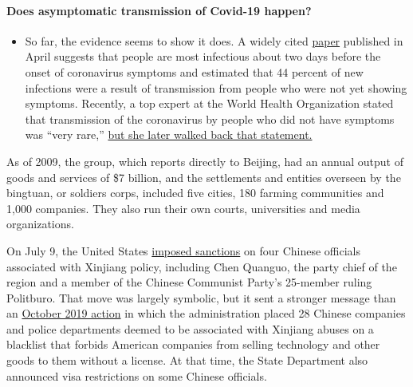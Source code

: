 \begin{itemize}
{  \paragraph{Does asymptomatic transmission of Covid-19
  happen?}\label{does-asymptomatic-transmission-of-covid-19-happen}}

  \begin{itemize}
  \tightlist
  \item
    So far, the evidence seems to show it does. A widely cited
    \href{https://www.nature.com/articles/s41591-020-0869-5}{paper}
    published in April suggests that people are most infectious about
    two days before the onset of coronavirus symptoms and estimated that
    44 percent of new infections were a result of transmission from
    people who were not yet showing symptoms. Recently, a top expert at
    the World Health Organization stated that transmission of the
    coronavirus by people who did not have symptoms was ``very rare,''
    \href{https://www.nytimes3xbfgragh.onion/2020/06/09/world/coronavirus-updates.html?action=click\&pgtype=Article\&state=default\&region=MAIN_CONTENT_3\&context=storylines_faq\#link-1f302e21}{but
    she later walked back that statement.}
  \end{itemize}
\end{itemize}

As of 2009, the group, which reports directly to Beijing, had an annual
output of goods and services of \$7 billion, and the settlements and
entities overseen by the bingtuan, or soldiers corps, included five
cities, 180 farming communities and 1,000 companies. They also run their
own courts, universities and media organizations.

On July 9, the United States
\href{https://www.nytimes3xbfgragh.onion/2020/07/09/world/asia/trump-china-sanctions-uighurs.html}{imposed
sanctions} on four Chinese officials associated with Xinjiang policy,
including Chen Quanguo, the party chief of the region and a member of
the Chinese Communist Party's 25-member ruling Politburo. That move was
largely symbolic, but it sent a stronger message than an
\href{https://www.nytimes3xbfgragh.onion/2019/10/08/business/china-human-rights-technology-xinjiang.html}{October
2019 action} in which the administration placed 28 Chinese companies and
police departments deemed to be associated with Xinjiang abuses on a
blacklist that forbids American companies from selling technology and
other goods to them without a license. At that time, the State
Department also announced visa restrictions on some Chinese officials.

